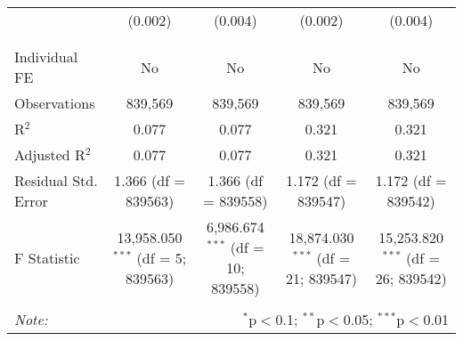 \documentclass[
]{article}
\begin{document}
\begin{table}[!htbp]
{\begin{tabular}{@{\extracolsep{5pt}}lcccc}
  & (0.002) & (0.004) & (0.002) & (0.004) \\ 
  & & & & \\ 
\hline \\[-1.8ex] 
Individual FE & No & No & No & No \\ 
Observations & 839,569 & 839,569 & 839,569 & 839,569 \\ 
R$^{2}$ & 0.077 & 0.077 & 0.321 & 0.321 \\ 
Adjusted R$^{2}$ & 0.077 & 0.077 & 0.321 & 0.321 \\ 
Residual Std. Error & 1.366 (df = 839563) & 1.366 (df = 839558) & 1.172 (df = 839547) & 1.172 (df = 839542) \\ 
F Statistic & 13,958.050$^{***}$ (df = 5; 839563) & 6,986.674$^{***}$ (df = 10; 839558) & 18,874.030$^{***}$ (df = 21; 839547) & 15,253.820$^{***}$ (df = 26; 839542) \\ 
\hline 
\hline \\[-1.8ex] 
\textit{Note:}  & \multicolumn{4}{r}{$^{*}$p$<$0.1; $^{**}$p$<$0.05; $^{***}$p$<$0.01} \\ 
\end{tabular}
} 
\end{table} 
\newpage
\end{document}
